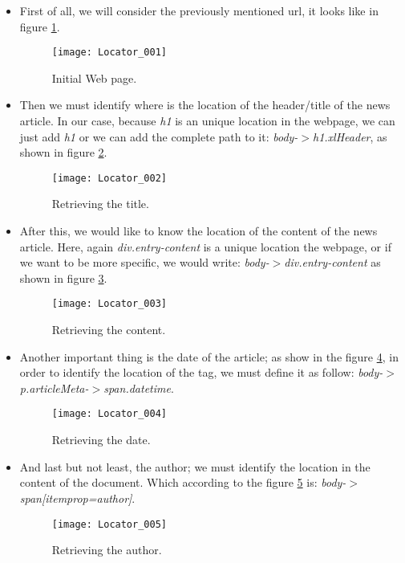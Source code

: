 \begin{itemize}
	\item First of all, we will consider the previously mentioned url, it looks like in figure \ref{fig:Locator_001}.
	
\begin{figure}\centering
	\texttt{[image: Locator\_001]}
	\caption{Initial Web page.}\label{fig:Locator_001}
\end{figure}
	
	\item Then we must identify where is the location of the header/title of the news article. In our case, because \emph{h1} is an unique location in the webpage, we can just add \emph{h1} or we can add the complete path to it: \emph{body-$>$h1.xlHeader}, as shown in figure \ref{fig:Locator_002}.
	
\begin{figure}\centering
	\texttt{[image: Locator\_002]}
	\caption{Retrieving the title.}\label{fig:Locator_002}
\end{figure}
	
	\item After this, we would like to know the location of the content of the news article. Here, again \emph{div.entry-content} is a unique location the webpage, or if we want to be more specific, we would write: \emph{body-$>$div.entry-content} as shown in figure \ref{fig:Locator_003}.

\begin{figure}\centering
	\texttt{[image: Locator\_003]}
	\caption{Retrieving the content.}\label{fig:Locator_003}
\end{figure}

	\item Another important thing is the date of the article; as show in the figure \ref{fig:Locator_004}, in order to identify the location of the tag, we must define it as follow: \emph{body-$>$p.articleMeta-$>$span.datetime}.
	
\begin{figure}\centering
	\texttt{[image: Locator\_004]}
	\caption{Retrieving the date.}\label{fig:Locator_004}
\end{figure}
	
	\item And last but not least, the author; we must identify the location in the content of the document. Which according to the figure \ref{fig:Locator_005} is: \emph{body-$>$span[itemprop=author]}.
	
\begin{figure}\centering
	\texttt{[image: Locator\_005]}
	\caption{Retrieving the author.}\label{fig:Locator_005}
\end{figure}
	
\end{itemize}


